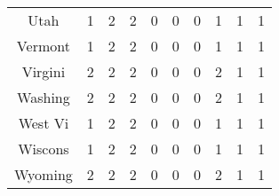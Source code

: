 \begin{longtable}{cp{1.5cm}p{1.5cm}p{1.5cm}p{1.5cm}p{1.5cm}p{1.5cm}p{1.5cm}p{1.5cm}p{1.5cm}}
Utah    &                          1 &                             2 &                          2 &                        0 &                           0 &                        0 &                         1 &                            1 &                         1 \\
Vermont &                          1 &                             2 &                          2 &                        0 &                           0 &                        0 &                         1 &                            1 &                         1 \\
Virgini &                          2 &                             2 &                          2 &                        0 &                           0 &                        0 &                         2 &                            1 &                         1 \\
Washing &                          2 &                             2 &                          2 &                        0 &                           0 &                        0 &                         2 &                            1 &                         1 \\
West Vi &                          1 &                             2 &                          2 &                        0 &                           0 &                        0 &                         1 &                            1 &                         1 \\
Wiscons &                          1 &                             2 &                          2 &                        0 &                           0 &                        0 &                         1 &                            1 &                         1 \\
Wyoming &                          2 &                             2 &                          2 &                        0 &                           0 &                        0 &                         2 &                            1 &                         1 \\
\end{longtable}
